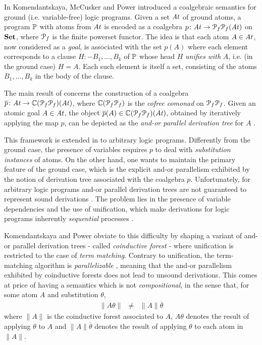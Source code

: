 
In \cite{KomMcCuskerPowerAMAST10} Komendantskaya, McCusker and Power introduced a coalgebraic semantics for ground (i.e. variable-free) logic programs. Given a set $\mathit{At}$ of ground atoms, a program $\mathbb{P}$ with atoms from $\mathit{At}$ is encoded as a coalgebra $p \colon \mathit{At} \to \mathcal P_f \mathcal P_f (\mathit{At})$ on $\mathbf{Set}$, where $\mathcal P _f$ is the finite powerset functor. The idea is that each atom $A \in \mathit{At}$, now considered as a \emph{goal}, is associated with the set $p(A)$ where each element corresponds to a clause $H :- B_1,\dots,B_k$ of $\mathbb{P}$ whose head $H$ \emph{unifies with} $A$, i.e. (in the ground case) $H = A$. Each such element is itself a set, consisting of the atoms $B_1,\dots, B_k$ in the body of the clause.

The main result of \cite{KomMcCuskerPowerAMAST10} concerns the construction of a coalgebra $\overline{p} \colon \mathit{At} \to \mathbb{C}(\mathcal P _f \mathcal P _f)(\mathit{At})$, where $\mathbb{C}(\mathcal P _f \mathcal P _f)$ is the \emph{cofree comonad} on $\mathcal P_f \mathcal P_f$. Given an atomic goal $A \in \mathit{At}$, the object $\overline{p}(A) \in \mathbb{C}(\mathcal P _f \mathcal P _f)(\mathit{At})$, obtained by iteratively applying the map $p$, can be depicted as the \emph{and-or parallel derivation tree} for $A$ \cite{Gupta94,Gupta2001,GuptaBMSM07}.

This framework is extended in \cite{KomPowCALCO11} to arbitrary logic programs. Differently from the ground case, the presence of variables requires $p$ to deal with \emph{substitution instances} of atoms. On the other hand, one wants to maintain the primary feature of the ground case, which is the explicit and-or parallelism exhibited by the notion of derivation tree associated with the coalgebra $p$. Unfortunately, for arbitrary logic programs and-or parallel derivation trees are not guaranteed to represent sound derivations \cite{Gupta94}. The problem lies in the presence of variable dependencies and the use of unification, which make derivations for logic programs inherently \emph{sequential} processes \cite{MitchellSeqUnification}.

Komendantskaya and Power \cite{KomPowCALCO11} obviate to this difficulty by shaping a variant of and-or parallel derivation trees - called \emph{coinductive forest} - where unification is restricted to the case of \emph{term matching}. Contrary to unification, the term-matching algorithm is \emph{parallelizable} \cite{MitchellSeqUnification}, meaning that the and-or parallelism exhibited by coinductive forests does not lead to unsound derivations. This comes at price of having a semantics which is not \emph{compositional}, in the sense that, for some atom $A$ and substitution $\theta$,
\begin{eqnarray*}
  \|A \theta\|&\neq& \|A\|\overline{\theta}
\end{eqnarray*}
where $\|A\|$ is the coinductive forest associated to $A$, $A \theta$ denotes the result of applying $\theta$ to $A$ and $\|A\|\overline{\theta}$ denotes the result of applying $\theta$ to each atom in $\|A\|$.

